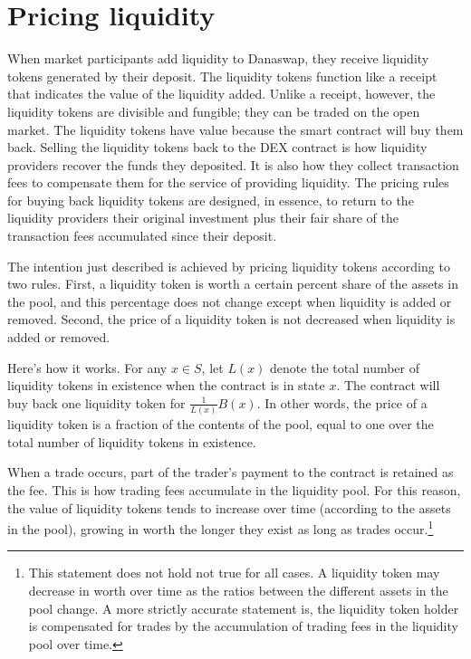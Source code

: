\documentclass[12pt]{article}
\begin{document}
\section{Pricing liquidity}

When market participants add liquidity to Danaswap, they receive liquidity tokens generated by their deposit. The liquidity tokens function like a receipt that indicates the value of the liquidity added. Unlike a receipt, however, the liquidity tokens are divisible and fungible; they can be traded on the open market. The liquidity tokens have value because the smart contract will buy them back. Selling the liquidity tokens back to the DEX contract is how liquidity providers recover the funds they deposited. It is also how they collect transaction fees to compensate them for the service of providing liquidity. The pricing rules for buying back liquidity tokens are designed, in essence, to return to the liquidity providers their original investment plus their fair share of the transaction fees accumulated since their deposit.

The intention just described is achieved by pricing liquidity tokens according to two rules. First, a liquidity token is worth a certain percent share of the assets in the pool, and this percentage does not change except when liquidity is added or removed. Second, the price of a liquidity token is not decreased when liquidity is added or removed.

Here's how it works. For any $x \in S$, let $L(x)$ denote the total number of liquidity tokens in existence when the contract is in state $x$. The contract will buy back one liquidity token for $\frac{1}{L(x)} B(x)$. In other words, the price of a liquidity token is a fraction of the contents of the pool, equal to one over the total number of liquidity tokens in existence.

When a trade occurs, part of the trader's payment to the contract is retained as the fee. This is how trading fees accumulate in the liquidity pool. For this reason, the value of liquidity tokens tends to increase over time (according to the assets in the pool), growing in worth the longer they exist as long as trades occur.\footnote{This statement does not hold not true for all cases. A liquidity token may decrease in worth over time as the ratios between the different assets in the pool change. A more strictly accurate statement is, the liquidity token holder is compensated for trades by the accumulation of trading fees in the liquidity pool over time.}
\end{document}
